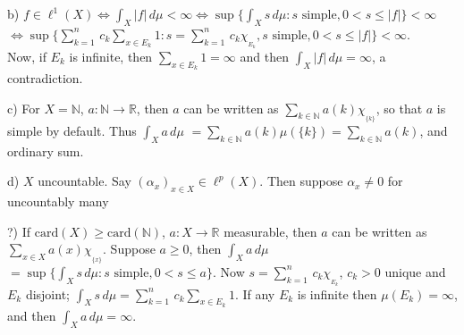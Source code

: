 \documentclass[12pt]{article}
\newcommand{\nats}[0] { \mathbb{N}}
\newcommand{\reals}[0] { \mathbb{R}}
\begin{document}
\begin{flushleft}

\end{flushleft}


\begin{flushleft}
b) $f \in \ell^1(X) \Leftrightarrow  \int_X  |f| \, d \mu < \infty \Leftrightarrow \sup \{  \int_X  s \, d \mu: s \textrm{ simple}, 0 < s \le |f|  \} < \infty $ \\
$\Leftrightarrow \sup \{  \sum_{k=1}^n \, c_k  \sum_{x \in E_k} 1: s = \sum_{k=1}^n \, c_k  \chi_{_{ E_k }}, s \textrm{ simple}, 0 < s \le |f|  \} < \infty $. \\
Now, if $E_k$ is infinite, then $\sum_{x \in E_k} 1= \infty$ and then $\int_X  |f| \, d \mu = \infty$, a contradiction.
\end{flushleft}

\begin{flushleft}
c) For $X = \nats$, $a:\nats \rightarrow \reals$, then $a$ can be written as $\sum_{k \in \nats} a(k) \chi_{_{ \{ k \} }}$, so that $a$ is simple by default. Thus $\int_X a \, d \mu$ $= \sum_{k \in \nats} a(k) \mu(\{ k \}) = \sum_{k \in \nats} a(k)  $, and ordinary sum.
\end{flushleft}

\begin{flushleft}
d) $X$ uncountable. Say $(\alpha_x)_{x \in X} \in \ell^p(X)$. Then suppose $\alpha_x \not = 0$ for uncountably many 
\end{flushleft}


\begin{flushleft}
?) If $\textrm{card}(X) \ge \textrm{card}(\nats)$, $a:X \rightarrow \reals$ measurable, then $a$ can be written as $\sum_{x \in X} a(x) \chi_{_{ \{ x \} }}$. Suppose $a \ge 0$, then $\int_X a \, d \mu$ $= \sup \{ \int_X  s \, d \mu: s \textrm{ simple}, 0 < s \le a \} $. Now $s = \sum_{k=1}^n \, c_k  \chi_{_{ E_k }}$, $c_k > 0$ unique and $E_k$ disjoint;
$\int_X s \, d \mu  = \sum_{k=1}^n \, c_k  \sum_{x \in E_k} 1$. If any $E_k$ is infinite then $\mu(E_k) = \infty$, and then $\int_X a \, d \mu = \infty$.
\end{flushleft}
\end{document}
